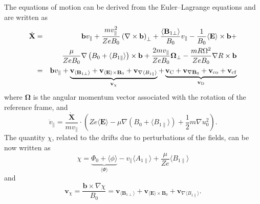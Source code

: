 The equations of motion can be derived from the Euler--Lagrange equations and are written as
\begin{eqnarray}
	\dot{\mathbf{X}} &=& \mathbf{b} v_{\parallel} + \frac{m v_{\parallel}^2}{Z e B_0} \left( \nabla \times \mathbf{b} \right)_{\perp} + \frac{\langle \mathbf{B}_{1 \perp} \rangle} {B_0} v_{\parallel} - \frac{1}{B_0} \langle \mathbf{E} \rangle \times \mathbf{b} + \nonumber \\
	&& \frac{\mu}{Z e B_0} \nabla \left( B_0 + \langle B_{1 \parallel} \rangle \right) \times \mathbf{b} + \frac{2 m v_{\parallel}}{Z e B_0} \mathbf{\Omega}_{\perp} - \frac{m R \Omega^2}{Z e B_0} \nabla R \times \mathbf{b} \nonumber \\
	&=& \mathbf{b} v_{\parallel} + \underbrace{\mathbf{v}_{\langle \mathbf{B}_{1 \perp} \rangle} + \mathbf{v}_{\langle \mathbf{E} \rangle \times \mathbf{B}_0} + \mathbf{v}_{\nabla \langle B_{1\parallel} \rangle}}_{\mathbf{v}_{\chi}} + \underbrace{\mathbf{v}_{\mathrm{C}} + \mathbf{v}_{\nabla \mathbf{B}_0} + \mathbf{v}_{\mathrm{co}} + \mathbf{v}_{\mathrm{cf}}}_{\mathbf{v}_{\mathrm{D}}}
\end{eqnarray}
where $\mathbf{\Omega}$ is the angular momentum  vector associated with the rotation of the reference frame, and
\begin{equation}
	\dot{v}_{\parallel} = \frac{\dot{\mathbf{X}}}{m v_{\parallel}} \cdot \left( Z e \langle \mathbf{E} \rangle - \mu \nabla (B_0 + \langle B_{1 \parallel} \rangle) + \frac{1}{2}m \nabla u_0^2 \right).
\end{equation}
The quantity $\chi$, related to the drifts due to perturbations of the fields, can be now written as
\begin{equation}
\chi = \underbrace{\Phi_0 + \langle \phi \rangle}_{\langle \Phi \rangle} - v_{\parallel} \langle {A}_{1 \parallel} \rangle + \frac{\mu}{Z e} \langle B_{1 \parallel} \rangle 
\end{equation}
and
\begin{equation}
\mathbf{v}_{\chi} = \frac{\mathbf{b} \times \nabla \chi}{B_0} = \mathbf{v}_{\langle \mathbf{B}_{1 \perp} \rangle} + \mathbf{v}_{\langle \mathbf{E} \rangle \times \mathbf{B}_0} + \mathbf{v}_{\nabla \langle B_{1 \parallel} \rangle}. 
\end{equation}

